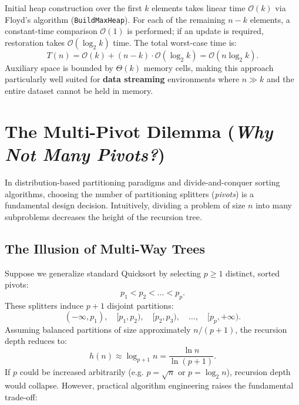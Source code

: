 \begin{property}
Initial heap construction over the first $k$ elements takes linear time $\mathcal{O}(k)$ via Floyd's algorithm (\texttt{BuildMaxHeap}). For each of the remaining $n - k$ elements, a constant-time comparison $\mathcal{O}(1)$ is performed; if an update is required, restoration takes $\mathcal{O}(\log_2 k)$ time. The total worst-case time is:
\begin{equation}
  T(n) = \mathcal{O}(k) + (n - k) \cdot \mathcal{O}(\log_2 k) = \mathcal{O}(n \log_2 k).
\end{equation}
Auxiliary space is bounded by $\Theta(k)$ memory cells, making this approach particularly well suited for \textbf{data streaming} environments where $n \gg k$ and the entire dataset cannot be held in memory.
\end{property}

\FloatBarrier
\section{The Multi-Pivot Dilemma (\textit{Why Not Many Pivots?})}
\label{sec:multi-pivot-dilemma}

In distribution-based partitioning paradigms and divide-and-conquer sorting algorithms, choosing the number of partitioning splitters (\textit{pivots}) is a fundamental design decision. Intuitively, dividing a problem of size $n$ into many subproblems decreases the height of the recursion tree.

\subsection{The Illusion of Multi-Way Trees}
\label{subsec:tree-depth-illusion}

Suppose we generalize standard Quicksort by selecting $p \ge 1$ distinct, sorted pivots:
\begin{equation}
  p_1 < p_2 < \dots < p_p.
\end{equation}
These splitters induce $p + 1$ disjoint partitions:
\begin{equation}
  (-\infty, p_1), \quad [p_1, p_2), \quad [p_2, p_3), \quad \dots, \quad [p_p, +\infty).
\end{equation}
Assuming balanced partitions of size approximately $n / (p + 1)$, the recursion depth reduces to:
\begin{equation}
  h(n) \approx \log_{p+1} n = \frac{\ln n}{\ln(p + 1)}.
\end{equation}
If $p$ could be increased arbitrarily (e.g. $p = \sqrt{n}$ or $p = \log_2 n$), recursion depth would collapse. However, practical algorithm engineering raises the fundamental trade-off:

